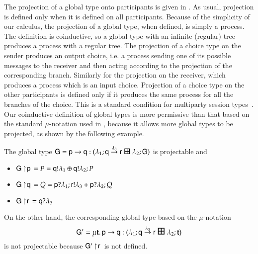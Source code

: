\bigskip

The projection of a global type onto participants is given in
. As usual, projection is defined only when it
is defined on all participants. Because of the simplicity of our
calculus, the projection of a global type, when defined, is simply a
process.  The definition is coinductive, so a global type with an
infinite (regular) tree produces a process with a regular tree. The
projection of a choice type on the sender produces an output choice,
i.e. a process sending one of its possible messages to the receiver
and then acting according to the projection of the corresponding
branch.  Similarly for the projection on the receiver, which produces
a process which is an input choice.  Projection of a choice type on
the other participants is defined only if it produces the same process
for all the branches of the choice. This is a
standard condition for multiparty session types~\cite{CHY08}.\\
 
 
Our coinductive definition of global types is more permissive than that based
on the standard $\mu$-notation used in \cite{CHY08}, because it
allows more global types to be projected, as shown by  the
following example.
 \begin{example}\label{de}
   The global type $\G=
   \gtCom\pp\q{}:(\Seq{\la_1}{\gtCom\q\pr{\la_3}}~\GlSyB~\Seq{\la_2}{\G})$
   is projectable and
\begin{itemize}
  \item ${\sf G} \! \upharpoonright \! {\sf p}\,=P={\sf q}!\lambda_1 \oplus{\sf q}!\lambda_2;P$
  \item ${\sf G} \! \upharpoonright \! {\sf q}\,=Q={\sf p}?\lambda_1;{\sf r}!\lambda_3 +{\sf p}?\lambda_2;Q$
  \item ${\sf G} \! \upharpoonright \! {\sf r}\,={\sf q}?\lambda_3$
\end{itemize}
 On the other hand, the corresponding global type based on the
$\mu$-notation 
\[\G'=\mu\ty.  \,\gtCom\pp\q{}:  (\Seq{\la_1}{\gtCom\q\pr{\la_3}}~\GlSyB~\Seq{\la_2}{\ty})\]
 is not projectable because ${\sf G}' \! \upharpoonright \! {\sf r}\,$
is not defined. 
\end{example}


